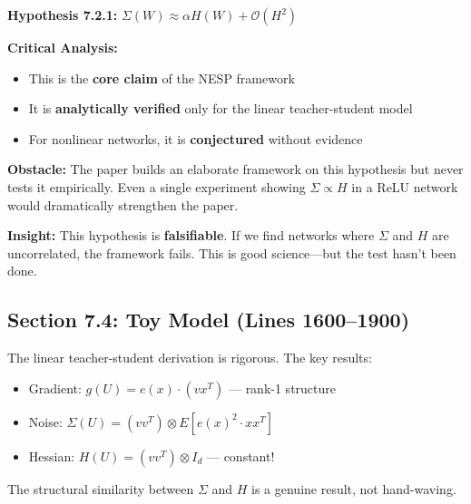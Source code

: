 \documentclass[11pt]{article}
\begin{document}
\begin{vuongmacbox}
\textbf{Hypothesis 7.2.1:} $\Sigma(W) \approx \alpha H(W) + \mathcal{O}(H^2)$

\textbf{Critical Analysis:}
\begin{itemize}
    \item This is the \textbf{core claim} of the NESP framework
    \item It is \textbf{analytically verified} only for the linear teacher-student model
    \item For nonlinear networks, it is \textbf{conjectured} without evidence
\end{itemize}

\textbf{Obstacle:} The paper builds an elaborate framework on this hypothesis but never tests it empirically. Even a single experiment showing $\Sigma \propto H$ in a ReLU network would dramatically strengthen the paper.

\textbf{Insight:} This hypothesis is \textbf{falsifiable}. If we find networks where $\Sigma$ and $H$ are uncorrelated, the framework fails. This is good science---but the test hasn't been done.
\end{vuongmacbox}

\subsection{Section 7.4: Toy Model (Lines 1600--1900)}

\begin{insightbox}
The linear teacher-student derivation is rigorous. The key results:
\begin{itemize}
    \item Gradient: $g(U) = e(x) \cdot (v x^T)$ --- rank-1 structure
    \item Noise: $\Sigma(U) = (vv^T) \otimes E[e(x)^2 \cdot xx^T]$
    \item Hessian: $H(U) = (vv^T) \otimes I_d$ --- constant!
\end{itemize}
The structural similarity between $\Sigma$ and $H$ is a genuine result, not hand-waving.
\end{insightbox}
\end{document}
